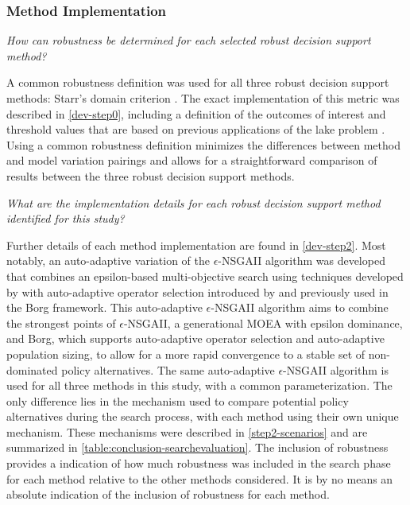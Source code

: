         \subsubsection{Method Implementation}
        \textit{How can robustness be determined for each selected robust decision support method?} 
        
        A common robustness definition was used for all three robust decision support methods: Starr's domain criterion \citep{Starr1963}. The exact implementation of this metric was described in \cref{dev-step0}, including a definition of the outcomes of interest and threshold values that are based on previous applications of the lake problem \citep{Quinn2017, Ward2015}. Using a common robustness definition minimizes the differences between method and model variation pairings and allows for a straightforward comparison of results between the three robust decision support methods. 
        
        \textit{What are the implementation details for each robust decision support method identified for this study?}
        
        Further details of each method implementation are found in \cref{dev-step2}. Most notably, an auto-adaptive variation of the $\epsilon$-NSGAII algorithm was developed that combines an epsilon-based multi-objective search using techniques developed by \citet{Deb2002} with auto-adaptive operator selection introduced by \citet{HadkaReed2013} and previously used in the Borg framework. This auto-adaptive $\epsilon$-NSGAII algorithm aims to combine the strongest points of $\epsilon$-NSGAII, a generational MOEA with epsilon dominance, and Borg, which supports auto-adaptive operator selection and auto-adaptive population sizing, to allow for a more rapid convergence to a stable set of non-dominated policy alternatives. The same auto-adaptive $\epsilon$-NSGAII algorithm is used for all three methods in this study, with a common parameterization. The only difference lies in the mechanism used to compare potential policy alternatives during the search process, with each method using their own unique mechanism. These mechanisms were described in \cref{step2-scenarios} and are summarized in \cref{table:conclusion-searchevaluation}. The inclusion of robustness provides a indication of how much robustness was included in the search phase for each method relative to the other methods considered. It is by no means an absolute indication of the inclusion of robustness for each method. 
        
